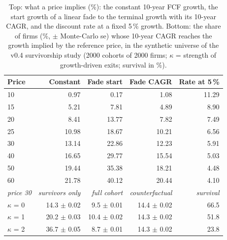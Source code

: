 \begin{table}[H]
\centering
\scriptsize
\caption{Top: what a price implies (\%): the constant 10-year FCF growth, the start growth of a linear fade to the terminal growth with its 10-year CAGR, and the discount rate at a fixed 5\,\% growth. Bottom: the share of firms (\%, $\pm$ Monte-Carlo se) whose 10-year CAGR reaches the growth implied by the reference price, in the synthetic universe of the v0.4 survivorship study (2000 cohorts of 2000 firms; $\kappa$ = strength of growth-driven exits; survival in \%).}
\label{tab:D2_implied_growth}
\setlength{\tabcolsep}{5pt}
\begin{tabular}{lrrrr}
\toprule
Price & Constant & Fade start & Fade CAGR & Rate at 5\,\% \\
\midrule
10 & 0.97 & 0.17 & 1.08 & 11.29 \\
15 & 5.21 & 7.81 & 4.89 & 8.90 \\
20 & 8.41 & 13.77 & 7.82 & 7.49 \\
25 & 10.98 & 18.67 & 10.21 & 6.56 \\
30 & 13.14 & 22.86 & 12.23 & 5.91 \\
40 & 16.65 & 29.77 & 15.54 & 5.03 \\
50 & 19.44 & 35.38 & 18.21 & 4.48 \\
60 & 21.78 & 40.12 & 20.44 & 4.10 \\
\midrule
\textit{price 30} & \textit{survivors only} & \textit{full cohort} & \textit{counterfactual} & \textit{survival} \\
$\kappa$ = 0 & 14.3 $\pm$ 0.02 & 9.5 $\pm$ 0.01 & 14.4 $\pm$ 0.02 & 66.5 \\
$\kappa$ = 1 & 20.2 $\pm$ 0.03 & 10.4 $\pm$ 0.02 & 14.3 $\pm$ 0.02 & 51.8 \\
$\kappa$ = 2 & 36.7 $\pm$ 0.05 & 8.7 $\pm$ 0.01 & 14.3 $\pm$ 0.02 & 23.8 \\
\bottomrule
\end{tabular}
\end{table}
